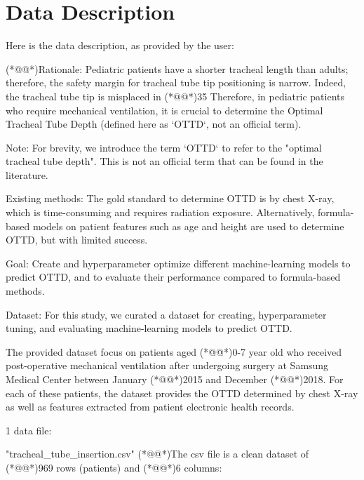 \documentclass[11pt]{article}
\begin{document}




\clearpage
\appendix

\section{Data Description} \label{sec:data_description} Here is the data description, as provided by the user:

\begin{codeoutput}
(*@@*)Rationale: Pediatric patients have a shorter tracheal length than adults; therefore, the safety margin for tracheal tube tip positioning is narrow.
Indeed, the tracheal tube tip is misplaced in (*@@*)35%
Therefore, in pediatric patients who require mechanical ventilation, it is crucial to determine the Optimal Tracheal Tube Depth (defined here as `OTTD`, not an official term).

Note: For brevity, we introduce the term `OTTD` to refer to the "optimal tracheal tube depth". This is not an official term that can be found in the literature.

Existing methods: The gold standard to determine OTTD is by chest X-ray, which is time-consuming and requires radiation exposure.
Alternatively, formula-based models on patient features such as age and height are used to determine OTTD, but with limited success.

Goal: Create and hyperparameter optimize different machine-learning models to predict OTTD, and to evaluate their performance compared to formula-based methods.

Dataset: For this study, we curated a dataset for creating, hyperparameter tuning, and evaluating machine-learning models to predict OTTD.

The provided dataset focus on patients aged (*@@*)0-7 year old who received post-operative mechanical ventilation after undergoing surgery at Samsung Medical Center between January (*@@*)2015 and December (*@@*)2018.
For each of these patients, the dataset provides the OTTD determined by chest X-ray as well as features extracted from patient electronic health records.


1 data file:

"tracheal_tube_insertion.csv"
(*@@*)The csv file is a clean dataset of (*@@*)969 rows (patients) and (*@@*)6 columns:


\end{codeoutput}
\end{document}
